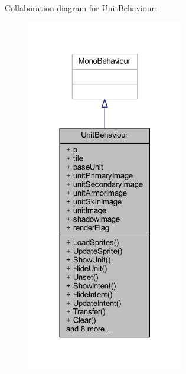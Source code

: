 Collaboration diagram for Unit\+Behaviour\+:\nopagebreak
\begin{figure}[H]
\begin{center}
\leavevmode
\includegraphics[width=194pt]{class_unit_behaviour__coll__graph}
\end{center}
\end{figure}
